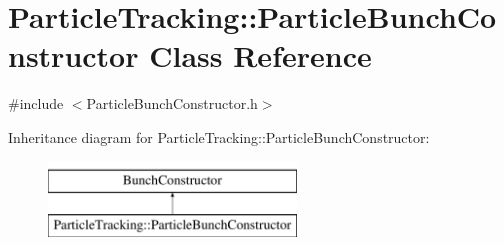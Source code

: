 \hypertarget{classParticleTracking_1_1ParticleBunchConstructor}{}\section{Particle\+Tracking\+:\+:Particle\+Bunch\+Constructor Class Reference}
\label{classParticleTracking_1_1ParticleBunchConstructor}


{\ttfamily \#include $<$Particle\+Bunch\+Constructor.\+h$>$}

Inheritance diagram for Particle\+Tracking\+:\+:Particle\+Bunch\+Constructor\+:\begin{figure}[H]
\begin{center}
\leavevmode
\includegraphics[height=2.000000cm]{classParticleTracking_1_1ParticleBunchConstructor}
\end{center}
\end{figure}
